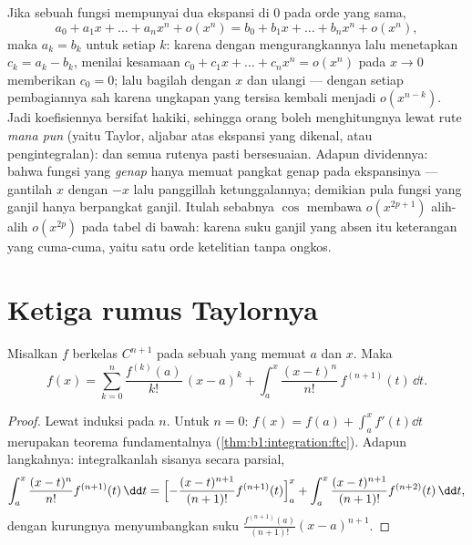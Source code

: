 \begin{example}\label{ex:b1:taylor:uniqueness}
Jika sebuah fungsi mempunyai dua ekspansi di $0$ pada orde yang sama,
\[
a_0 + a_1 x + \dots + a_n x^n + o(x^n)
= b_0 + b_1 x + \dots + b_n x^n + o(x^n),
\]
maka $a_k = b_k$ untuk setiap $k$: karena dengan mengurangkannya lalu menetapkan $c_k =
a_k - b_k$, menilai kesamaan $c_0 + c_1 x + \dots + c_n x^n
= o(x^n)$ pada $x \to 0$ memberikan $c_0 = 0$; lalu bagilah dengan $x$ dan
ulangi --- dengan setiap pembagiannya sah karena ungkapan yang tersisa
kembali menjadi $o(x^{n-k})$. Jadi koefisiennya bersifat
hakiki, sehingga orang boleh menghitungnya lewat rute \emph{mana pun} (yaitu 
Taylor, aljabar atas ekspansi yang dikenal, atau pengintegralan): dan semua
rutenya pasti bersesuaian. Adapun dividennya: bahwa fungsi yang \emph{genap} hanya memuat
pangkat genap pada ekspansinya --- gantilah $x$ dengan $-x$ lalu panggillah
ketunggalannya; demikian pula fungsi yang ganjil hanya berpangkat ganjil. Itulah sebabnya
$\cos$ membawa $o(x^{2p+1})$ alih-alih $o(x^{2p})$ pada
tabel di bawah: karena suku ganjil yang absen itu keterangan yang cuma-cuma, yaitu satu orde
ketelitian tanpa ongkos.
\end{example}

\section{Ketiga rumus Taylornya}

\begin{theorem}\label{thm:b1:taylor:integral}
Misalkan $f$ berkelas $C^{n+1}$ pada sebuah  yang memuat $a$ dan $x$.
Maka
\[
f(x) = \sum_{k=0}^{n} \frac{f^{(k)}(a)}{k!}\,(x - a)^k
+ \int_a^x \frac{(x - t)^n}{n!}\, f^{(n+1)}(t)\, \dd t .
\]
\end{theorem}

\begin{proof}
Lewat induksi pada $n$. Untuk $n = 0$: $f(x) = f(a) + \int_a^x f'(t)\dd t$ merupakan
teorema fundamentalnya (\cref{thm:b1:integration:ftc}). Adapun langkahnya:
integralkanlah sisanya secara parsial,
\[
\int_a^x \frac{(x-t)^n}{n!} f^{(n+1)}(t)\,\dd t
= \Bigl[-\frac{(x-t)^{n+1}}{(n+1)!} f^{(n+1)}(t)\Bigr]_a^x
+ \int_a^x \frac{(x-t)^{n+1}}{(n+1)!} f^{(n+2)}(t)\,\dd t ,
\]
dengan kurungnya menyumbangkan suku $\frac{f^{(n+1)}(a)}{(n+1)!}(x -
a)^{n+1}$.
\end{proof}

